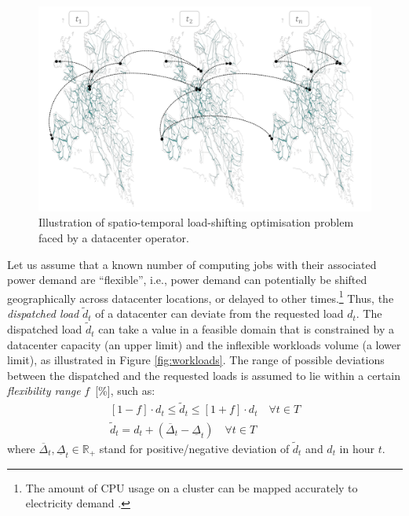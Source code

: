 \begin{figure}
    \centering
    \includegraphics[width=1\columnwidth]{img/datacenter-problem.png}
    \caption{Illustration of spatio-temporal load-shifting optimisation problem faced by a datacenter operator.}
    \label{fig:space-time-optimisation}
\end{figure}

Let us assume that a known number of computing jobs with their associated power demand are \enquote{flexible}, i.e., power demand can potentially be shifted geographically across datacenter locations, or delayed to other times.\footnote{The amount of CPU usage on a cluster can be mapped accurately to electricity demand \cite{radovanovicIEEE2023}.} Thus, the \textit{dispatched load} $\widetilde{d}_t$ of a datacenter can deviate from the requested load $d_t$. The dispatched load $\widetilde{d}_t$ can take a value in a feasible domain that is constrained by a datacenter capacity (an upper limit) and the inflexible workloads volume (a lower limit), as illustrated in Figure \ref{fig:workloads}. The range of possible deviations between the dispatched and the requested loads is assumed to lie within a certain \textit{flexibility range} $f$~[\%], such as:
\begin{subequations}
  \begin{align}
    [1-f] \cdot d_t \le  \widetilde{d}_t  \le [1+f] \cdot d_t \quad \forall t \in T
    \label{eqn:dcaps} \\
    \widetilde{d}_t = d_t + (\overline{\Delta}_t - \underline{\Delta}_t) \quad \forall t \in T
    \label{eqn:dtilde}
  \end{align}
  \label{eqn:range}
\end{subequations}
\noindent where $\overline{\Delta}_t, \underline{\Delta}_t \in \mathbb{R}_{+}$ stand for positive/negative deviation of $\widetilde{d}_t$ and $d_t$ in hour $t$.

